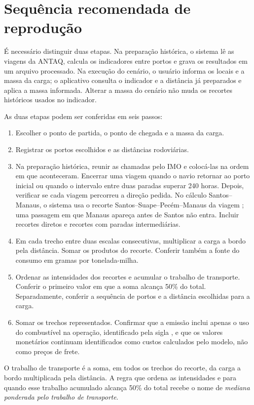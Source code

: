 \section{Sequência recomendada de reprodução}

É necessário distinguir duas etapas. Na preparação histórica, o sistema lê as viagens da ANTAQ, calcula os indicadores entre portos e grava os resultados em um arquivo processado. Na execução do cenário, o usuário informa os locais e a massa da carga; o aplicativo consulta o indicador e a distância já preparados e aplica a massa informada. Alterar a massa do cenário não muda os recortes históricos usados no indicador.

As duas etapas podem ser conferidas em seis passos:

\begin{enumerate}
    \item Escolher o ponto de partida, o ponto de chegada e a massa da carga.
    \item Registrar os portos escolhidos e as distâncias rodoviárias.
    \item Na preparação histórica, reunir as chamadas pelo IMO e colocá-las na ordem em que aconteceram. Encerrar uma viagem quando o navio retornar ao porto inicial ou quando o intervalo entre duas paradas superar 240 horas. Depois, verificar se cada viagem percorreu a direção pedida. No cálculo Santos--Manaus, o sistema usa o recorte Santos--Suape--Pecém--Manaus da viagem ; uma passagem em que Manaus apareça antes de Santos não entra. Incluir recortes diretos e recortes com paradas intermediárias.
    \item Em cada trecho entre duas escalas consecutivas, multiplicar a carga a bordo pela distância. Somar os produtos do recorte. Conferir também a fonte do consumo em gramas por tonelada-milha.
    \item Ordenar as intensidades dos recortes e acumular o trabalho de transporte. Conferir o primeiro valor em que a soma alcança 50\% do total. Separadamente, conferir a sequência de portos e a distância escolhidas para a carga.
    \item Somar os trechos representados. Confirmar que a emissão inclui apenas o uso do combustível na operação, identificado pela sigla \ttw{}, e que os valores monetários continuam identificados como custos calculados pelo modelo, não como preços de frete.
\end{enumerate}

O trabalho de transporte é a soma, em todos os trechos do recorte, da carga a bordo multiplicada pela distância. A regra que ordena as intensidades e para quando esse trabalho acumulado alcança 50\% do total recebe o nome de \emph{mediana ponderada pelo trabalho de transporte}.

